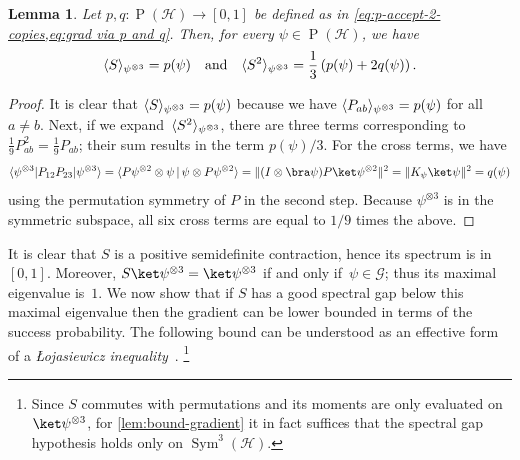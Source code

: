 \documentclass[11pt,a4paper]{article}
\newtheorem{lemma}[theorem]{Lemma}\AddToHook{env/lemma/begin}{\crefalias{theorem}{lemma}}
\numberwithin{equation}{section}
\newcommand{\ot}{\otimes}
\newcommand{\HH}{\mathcal{H}}
\newcommand{\GG}{\mathcal G}
\newcommand{\1}{\mathbf{1}}
\renewcommand{\P}{\operatorname{P}}
\DeclareMathOperator{\Sym}{Sym}
\DeclarePairedDelimiter\norm{\lVert}{\rVert}
\DeclarePairedDelimiter\ip{\langle}{\rangle}
\begin{document}
\begin{lemma}\label{lem:three-copy-moments}
Let $p, q \colon \P(\HH) \to [0,1]$ be defined as in \cref{eq:p-accept-2-copies,eq:grad via p and q}.
Then, for every $\psi \in \P(\HH)$, we have
\begin{align*}
    \ip{S}_{\psi^{\ot 3}} = p(\psi)
    \quad\text{and}\quad
    \ip{S^2}_{\psi^{\ot 3}} = \frac13\left( p(\psi) + 2q(\psi) \right).
\end{align*}
\end{lemma}
\begin{proof}
    It is clear that $\ip{S}_{\psi^{\ot 3}} = p(\psi)$ because we have $\ip{P_{ab}}_{\psi^{\ot 3}} = p(\psi)$ for all $a\neq b$.
    Next, if we expand~$\ip{S^2}_{\psi^{\ot 3}}$, there are three terms corresponding to $\frac19 P_{ab}^2 = \frac19 P_{ab}$; their sum results in the term $p(\psi)/3$.
    For the cross terms, we have
    \begin{align*}
        \ip{\psi^{\ot 3} | P_{12} P_{23} | \psi^{\ot 3}}
    = \ip{P \psi^{\ot 2} \ot \psi \,|\, \psi \ot P \psi^{\ot 2}}
    = \norm{(I \ot \bra\psi) P \ket\psi^{\ot 2}}^2
    = \norm{K_\psi \ket\psi}^2
    = q(\psi)
    \end{align*}
    using the permutation symmetry of $P$ in the second step.
    Because $\psi^{\ot 3}$ is in the symmetric subspace, all six cross terms are equal to $1/9$ times the above.
\end{proof}

It is clear that $S$ is a positive semidefinite contraction, hence its spectrum is in~$[0,1]$.
Moreover, $S \ket\psi^{\ot 3} = \ket\psi^{\ot 3}$ if and only if~$\psi \in \GG$; thus its maximal eigenvalue is~$1$.
We now show that if $S$ has a good spectral gap below this maximal eigenvalue then the gradient can be lower bounded in terms of the success probability.
The following bound can be understood as an effective form of a \emph{\L{}ojasiewicz inequality}~\cite{lojasiewicz1965ensembles}.%
\footnote{Since $S$ commutes with permutations and its moments are only evaluated on~$\ket\psi^{\ot 3}$, for \cref{lem:bound-gradient} it in fact suffices that the spectral gap hypothesis holds only on $\Sym^3(\HH)$.}
\end{document}
